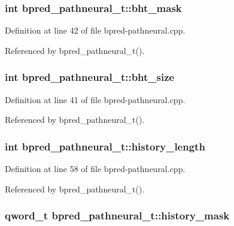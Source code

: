 \subsubsection[{bht\_\-mask}]{\setlength{\rightskip}{0pt plus 5cm}int {\bf bpred\_\-pathneural\_\-t::bht\_\-mask}\hspace{0.3cm}{\tt  [protected]}}\label{classbpred__pathneural__t_a3fb89d26e18fff7d30e8f6f44a745c6}




Definition at line 42 of file bpred-pathneural.cpp.

Referenced by bpred\_\-pathneural\_\-t().
\subsubsection[{bht\_\-size}]{\setlength{\rightskip}{0pt plus 5cm}int {\bf bpred\_\-pathneural\_\-t::bht\_\-size}\hspace{0.3cm}{\tt  [protected]}}\label{classbpred__pathneural__t_7a9c2e417ece85c364ec98641502d789}




Definition at line 41 of file bpred-pathneural.cpp.

Referenced by bpred\_\-pathneural\_\-t().
\subsubsection[{history\_\-length}]{\setlength{\rightskip}{0pt plus 5cm}int {\bf bpred\_\-pathneural\_\-t::history\_\-length}\hspace{0.3cm}{\tt  [protected]}}\label{classbpred__pathneural__t_fab2213741e4db516ecaa1ccf93d613a}




Definition at line 58 of file bpred-pathneural.cpp.

Referenced by bpred\_\-pathneural\_\-t().
\subsubsection[{history\_\-mask}]{\setlength{\rightskip}{0pt plus 5cm}qword\_\-t {\bf bpred\_\-pathneural\_\-t::history\_\-mask}\hspace{0.3cm}{\tt  [protected]}}\label{classbpred__pathneural__t_f2c6b7907d971d883b5b2f1c73cfccb7}




